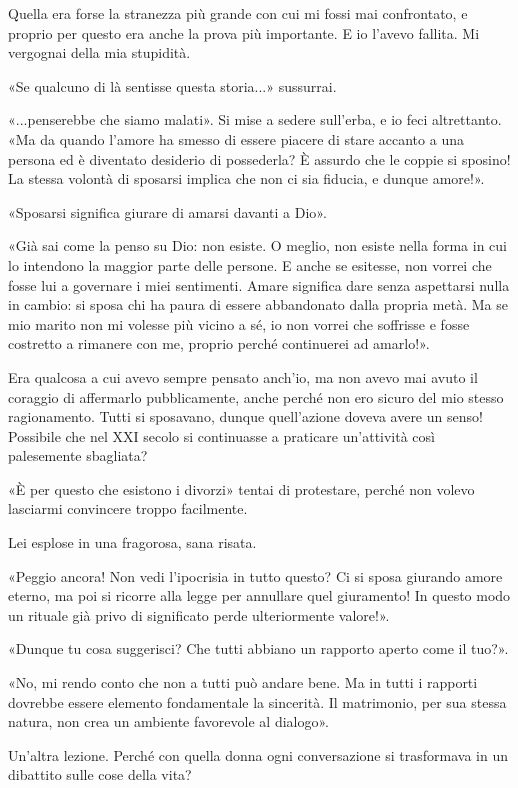 \documentclass[a4paper,12pt]{book}
\begin{document}
Quella era forse la stranezza più grande con cui mi fossi mai confrontato, e
proprio per questo era anche la prova più importante. E io l'avevo fallita. Mi
vergognai della mia stupidità.

«Se qualcuno di là sentisse questa storia...» sussurrai.

«...penserebbe che siamo malati». Si mise a sedere sull'erba, e io feci
altrettanto. «Ma da quando l'amore ha smesso di essere piacere di stare accanto
a una persona ed è diventato desiderio di possederla? È assurdo che le coppie si
sposino! La stessa volontà di sposarsi implica che non ci sia fiducia, e dunque
amore!».

«Sposarsi significa giurare di amarsi davanti a Dio».

«Già sai come la penso su Dio: non esiste. O meglio, non esiste nella forma in
cui lo intendono la maggior parte delle persone. E anche se esitesse, non vorrei
che fosse lui a governare i miei sentimenti. Amare significa dare senza
aspettarsi nulla in cambio: si sposa chi ha paura di essere abbandonato dalla
propria metà. Ma se mio marito non mi volesse più vicino a sé, io non vorrei che
soffrisse e fosse costretto a rimanere con me, proprio perché continuerei ad
amarlo!».

Era qualcosa a cui avevo sempre pensato anch'io, ma non avevo mai avuto il
coraggio di affermarlo pubblicamente, anche perché non ero sicuro del mio stesso
ragionamento. Tutti si sposavano, dunque quell'azione doveva avere un senso!
Possibile che nel XXI secolo si continuasse a praticare un'attività così
palesemente sbagliata?

«È per questo che esistono i divorzi» tentai di protestare, perché non volevo
lasciarmi convincere troppo facilmente.

Lei esplose in una fragorosa, sana risata.

«Peggio ancora! Non vedi l'ipocrisia in tutto questo? Ci si sposa giurando amore
eterno, ma poi si ricorre alla legge per annullare quel giuramento! In questo
modo un rituale già privo di significato perde ulteriormente valore!».

«Dunque tu cosa suggerisci? Che tutti abbiano un rapporto aperto come il tuo?».

«No, mi rendo conto che non a tutti può andare bene. Ma in tutti i rapporti
dovrebbe essere elemento fondamentale la sincerità. Il matrimonio, per sua
stessa natura, non crea un ambiente favorevole al dialogo».

Un'altra lezione. Perché con quella donna ogni conversazione si trasformava in
un dibattito sulle cose della vita?
\end{document}
